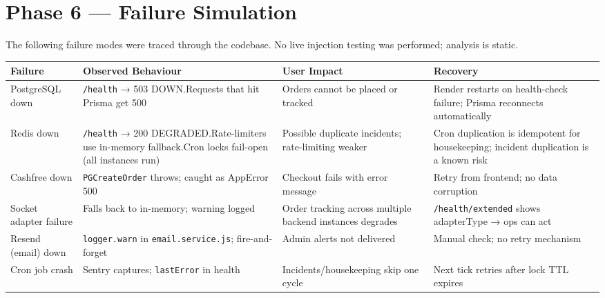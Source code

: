 \documentclass[12pt,a4paper]{article}
\begin{document}
\newpage

\section{Phase 6 — Failure Simulation}

The following failure modes were traced through the codebase.
No live injection testing was performed; analysis is static.

\begin{longtable}{p{3.5cm}p{3.5cm}p{3.5cm}p{3.5cm}}
\toprule
\rowcolor{tableheadbg}
\textbf{\color{white}Failure} & \textbf{\color{white}Observed Behaviour} & \textbf{\color{white}User Impact} & \textbf{\color{white}Recovery} \\
\midrule
PostgreSQL down &
  \texttt{/health} → 503 DOWN.\newline Requests that hit Prisma get 500 &
  Orders cannot be placed or tracked &
  Render restarts on health-check failure; Prisma reconnects automatically \\
\midrule
Redis down &
  \texttt{/health} → 200 DEGRADED.\newline Rate-limiters use in-memory fallback.\newline Cron locks fail-open (all instances run) &
  Possible duplicate incidents; rate-limiting weaker &
  Cron duplication is idempotent for housekeeping; incident duplication is a known risk \\
\midrule
Cashfree down &
  \texttt{PGCreateOrder} throws; caught as AppError 500 &
  Checkout fails with error message &
  Retry from frontend; no data corruption \\
\midrule
Socket adapter failure &
  Falls back to in-memory; warning logged &
  Order tracking across multiple backend instances degrades &
  \texttt{/health/extended} shows adapterType → ops can act \\
\midrule
Resend (email) down &
  \texttt{logger.warn} in \texttt{email.service.js}; fire-and-forget &
  Admin alerts not delivered &
  Manual check; no retry mechanism \\
\midrule
Cron job crash &
  Sentry captures; \texttt{lastError} in health &
  Incidents/housekeeping skip one cycle &
  Next tick retries after lock TTL expires \\
\bottomrule
\end{longtable}
\end{document}

